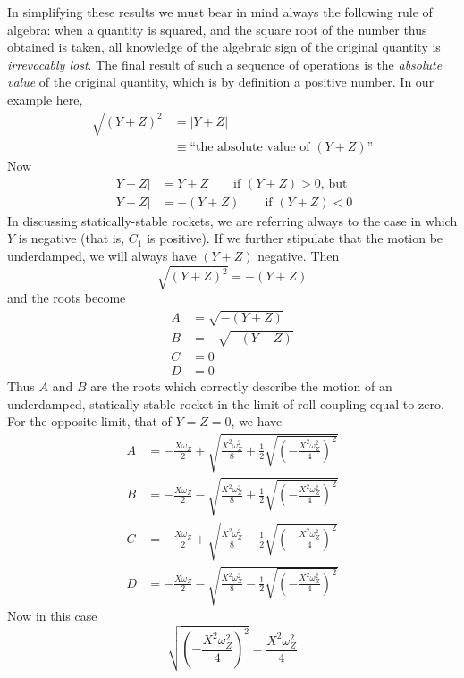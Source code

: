 In simplifying these results we must bear in mind always the following rule of
algebra: when a quantity is squared, and the square root of the number thus
obtained is taken, all knowledge of the algebraic sign of the original
quantity is \emph{irrevocably lost}. The final result of such a sequence of
operations is the \emph{absolute value} of the original quantity, which is by
definition a positive number. In our example here,
\begin{align*}
\sqrt{(Y + Z)^2} &= |Y + Z|\\
&\equiv \text{``the absolute value of $(Y + Z)$''}
\end{align*}
Now
\begin{align*}
|Y + Z| &= Y + Z \qquad \text{if } (Y + Z) > 0\text{, but}\\
|Y + Z| &= -(Y + Z) \qquad \text{if } (Y + Z) < 0
\end{align*}
In discussing statically-stable rockets, we are referring always to the case
in which $Y$ is negative (that is, $C_1$ is positive). If we further stipulate
that the motion be underdamped, we will always have $(Y + Z)$ negative. Then
\begin{equation*}
\sqrt{(Y + Z)^2} = -(Y + Z)
\end{equation*}
and the roots become
\begin{align*}
A &= \sqrt{-(Y + Z)}\\
B &= -\sqrt{-(Y + Z)}\\
C &= 0\\
D &= 0
\end{align*}
Thus $A$ and $B$ are the roots which correctly describe the motion of an
underdamped, statically-stable rocket in the limit of roll coupling equal to
zero. For the opposite limit, that of $Y = Z = 0$, we have
\begin{align*}
A &= -\frac{X\omega_Z}{2} + \sqrt{\frac{X^2\omega_Z^2}{8}
  + \tfrac{1}{2}\sqrt{\left(-\frac{X^2\omega_Z^2}{4}\right)^2}}\\
B &= -\frac{X\omega_Z}{2} - \sqrt{\frac{X^2\omega_Z^2}{8}
  + \tfrac{1}{2}\sqrt{\left(-\frac{X^2\omega_Z^2}{4}\right)^2}}\\
C &= -\frac{X\omega_Z}{2} + \sqrt{\frac{X^2\omega_Z^2}{8}
  - \tfrac{1}{2}\sqrt{\left(-\frac{X^2\omega_Z^2}{4}\right)^2}}\\
D &= -\frac{X\omega_Z}{2} - \sqrt{\frac{X^2\omega_Z^2}{8}
  - \tfrac{1}{2}\sqrt{\left(-\frac{X^2\omega_Z^2}{4}\right)^2}}
\end{align*}
Now in this case
\begin{equation*}
\sqrt{\left(-\frac{X^2\omega_Z^2}{4}\right)^2} = \frac{X^2\omega_Z^2}{4}
\end{equation*}
